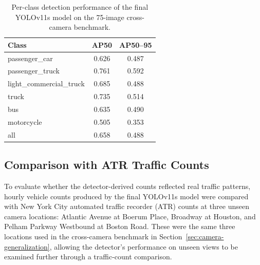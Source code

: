 \begin{table}[!htbp]
    \centering
    \caption{Per-class detection performance of the final YOLOv11s model on the 75-image cross-camera benchmark.}
    \label{tab:cross-camera-results}
    \begin{tabular}{l c c}
        \toprule
        Class & AP50 & AP50--95 \\
        \midrule
        passenger\_car            & 0.626 & 0.487 \\
        passenger\_truck          & 0.761 & 0.592 \\
        light\_commercial\_truck  & 0.685 & 0.488 \\
        truck                     & 0.735 & 0.514 \\
        bus                       & 0.635 & 0.490 \\
        motorcycle                & 0.505 & 0.353 \\
        \midrule
        all                       & 0.658 & 0.488 \\
        \bottomrule
    \end{tabular}
\end{table}
\FloatBarrier



\newpage
\subsection{Comparison with ATR Traffic Counts}
\label{sec:atr-analysis}

To evaluate whether the detector-derived counts reflected real traffic patterns,
hourly vehicle counts produced by the final YOLOv11s model were compared with
New York City automated traffic recorder (ATR) counts \cite{NYC_open_data_atr}
at three unseen camera locations: Atlantic Avenue at Boerum Place, Broadway at
Houston, and Pelham Parkway Westbound at Boston Road. These were the same three
locations used in the cross-camera benchmark in Section~\ref{sec:camera-generalization},
allowing the detector's performance on unseen views to be examined further through
a traffic-count comparison.

